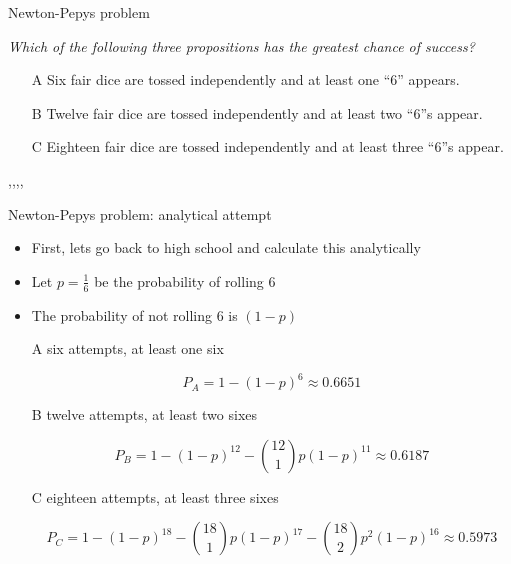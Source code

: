 \begin{slide}{Newton-Pepys problem}
\null\vfill

  \twocolumn
  {
    {\it
    Which of the following three propositions has the greatest chance of success?
    
    \begin{itemize}
      \item[A] Six fair dice are tossed independently and at least one “6” appears.
      \item[B] Twelve fair dice are tossed independently and at least two “6”s appear.
      \item[C] Eighteen fair dice are tossed independently and at least three “6”s appear.
    \end{itemize}
    }
  }
  {
    \sep\sep\sep\sep
    \centering\scalebox{0.15}{}
  }

\vfill\null
\end{slide}

\begin{slide}[toc=]{Newton-Pepys problem: analytical attempt}
\null\vfill

  \begin{itemize}
    \item First, lets go back to high school and calculate this analytically
    \item Let $p = \frac{1}{6}$ be the probability of rolling $6$
    \item The probability of not rolling $6$ is $(1 - p)$
    
    \item[A] six attempts, at least one six

    $$P_A = 1 - (1 - p)^6 \approx 0.6651$$

    \vspace{-5pt}
    \item[B] twelve attempts, at least two sixes
    
    $$P_B = 1 - (1 - p)^{12} - {12 \choose 1}p(1 - p)^{11} \approx 0.6187$$

    \vspace{-5pt}
    \item[C] eighteen attempts, at least three sixes
    
    $$P_C = 1 - (1 - p)^{18} - {18 \choose 1}p(1 - p)^{17} - {18 \choose 2}p^2(1 - p)^{16} \approx 0.5973$$
  
  \end{itemize}

\vfill\null
\end{slide}

